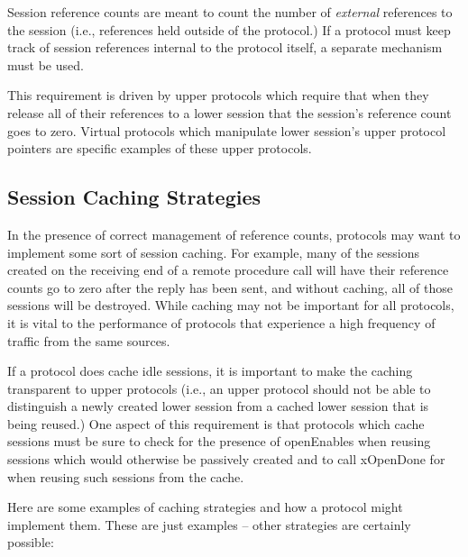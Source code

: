 Session reference counts are meant to count the number of {\em
external} references to the session (i.e., references held outside of
the protocol.)  If a protocol must keep track of session references
internal to the protocol itself, a separate mechanism must be used.

This requirement is driven by upper protocols which require that when
they release all of their references to a lower session that the
session's reference count goes to zero.  Virtual protocols which
manipulate lower session's upper protocol pointers are specific
examples of these upper protocols.


\subsection{Session Caching Strategies}

In the presence of correct management of reference counts, protocols
may want to implement some sort of session caching.  For example, many
of the sessions created on the receiving end of a remote procedure
call will have their reference counts go to zero after the reply has
been sent, and without caching, all of those sessions will be
destroyed.  While caching may not be important for all protocols, it
is vital to the performance of protocols that experience a high
frequency of traffic from the same sources.

If a protocol does cache idle sessions, it is important to make the
caching transparent to upper protocols (i.e., an upper protocol should
not be able to distinguish a newly created lower session from a
cached lower session that is being reused.)  One aspect of this
requirement is that protocols which cache sessions must be sure to
check for the presence of openEnables when reusing sessions which
would otherwise be passively created and to 
call xOpenDone for when reusing such sessions from the cache.

Here are some examples of caching strategies and how a protocol might
implement them.  These are just examples -- other strategies are
certainly possible:

